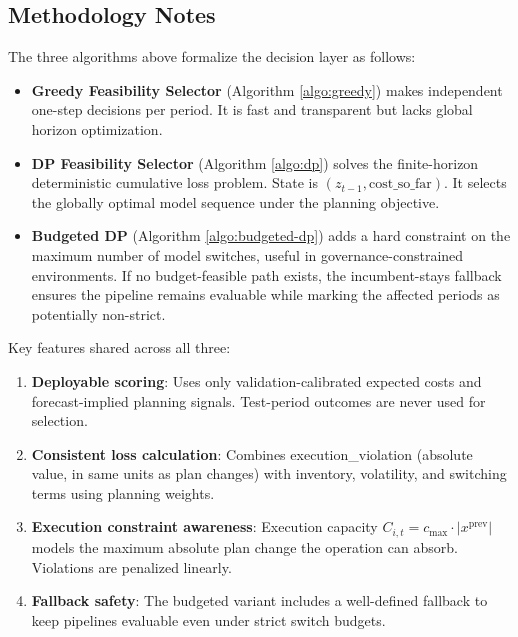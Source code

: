 \subsection{Methodology Notes}

The three algorithms above formalize the decision layer as follows:

\begin{itemize}
    \item \textbf{Greedy Feasibility Selector} (Algorithm \ref{algo:greedy}) makes independent one-step decisions per period. It is fast and transparent but lacks global horizon optimization.

    \item \textbf{DP Feasibility Selector} (Algorithm \ref{algo:dp}) solves the finite-horizon deterministic cumulative loss problem. State is $(z_{t-1}, \text{cost\_so\_far})$. It selects the globally optimal model sequence under the planning objective.

    \item \textbf{Budgeted DP} (Algorithm \ref{algo:budgeted-dp}) adds a hard constraint on the maximum number of model switches, useful in governance-constrained environments. If no budget-feasible path exists, the incumbent-stays fallback ensures the pipeline remains evaluable while marking the affected periods as potentially non-strict.
\end{itemize}

Key features shared across all three:
\begin{enumerate}
    \item \textbf{Deployable scoring}: Uses only validation-calibrated expected costs and forecast-implied planning signals. Test-period outcomes are never used for selection.

    \item \textbf{Consistent loss calculation}: Combines execution\_violation (absolute value, in same units as plan changes) with inventory, volatility, and switching terms using planning weights.

    \item \textbf{Execution constraint awareness}: Execution capacity $C_{i,t} = c_{\max} \cdot |x^{\text{prev}}|$ models the maximum absolute plan change the operation can absorb. Violations are penalized linearly.

    \item \textbf{Fallback safety}: The budgeted variant includes a well-defined fallback to keep pipelines evaluable even under strict switch budgets.
\end{enumerate}
